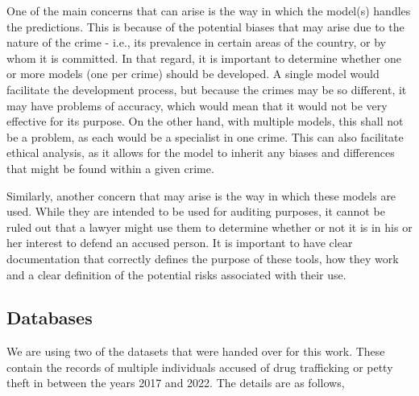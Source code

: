 \documentclass[fleqn,10pt]{wlscirep}
\begin{document}
One of the main concerns that can arise is the way in which the model(s) handles the predictions. This is because of the potential biases that may arise due to the nature of the crime - i.e., its prevalence in certain areas of the country, or by whom it is committed. In that regard, it is important to determine whether one or more models (one per crime) should be developed. A single model would facilitate the development process, but because the crimes may be so different, it may have problems of accuracy, which would mean that it would not be very effective for its purpose. On the other hand, with multiple models, this shall not be a problem, as each would be a specialist in one crime. This can also facilitate ethical analysis, as it allows for the model to inherit any biases and differences that might be found within a given crime.

Similarly, another concern that may arise is the way in which these models are used. While they are intended to be used for auditing purposes, it cannot be ruled out that a lawyer might use them to determine whether or not it is in his or her interest to defend an accused person. It is important to have clear documentation that correctly defines the purpose of these tools, how they work and a clear definition of the potential risks associated with their use.

\subsection{Databases}\label{subsec:Databases}

We are using two of the datasets that were handed over for this work. These contain the records of multiple individuals accused of drug trafficking or petty theft in between the years 2017 and 2022. The details are as follows,
\end{document}
